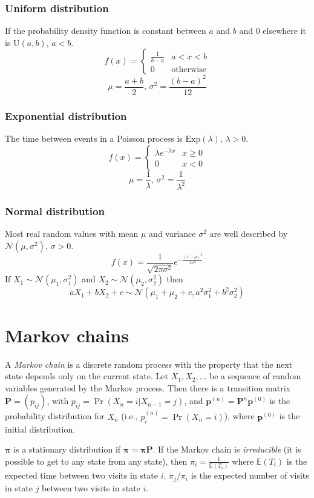 \subsubsection{Uniform distribution}
If the probability density function is constant between $a$ and $b$ and 0 elsewhere it is $\textrm{U}(a,b),\,a<b$.
\[f(x) = \left\{
\begin{array}{cl}
\frac{1}{b-a} & a<x<b\\
0 & \textrm{otherwise}
\end{array}\right.\]
\[\mu=\frac{a+b}{2},\,\sigma^2=\frac{(b-a)^2}{12}\]

\subsubsection{Exponential distribution}
The time between events in a Poisson process is $\textrm{Exp}(\lambda),\,\lambda>0$.
\[f(x) = \left\{
\begin{array}{cl}
\lambda e^{-\lambda x} & x\geq0\\
0 & x<0
\end{array}\right.\]
\[\mu=\frac{1}{\lambda},\,\sigma^2=\frac{1}{\lambda^2}\]

\subsubsection{Normal distribution}
Most real random values with mean $\mu$ and variance $\sigma^2$ are well described by $\mathcal{N}(\mu,\sigma^2),\,\sigma>0$.
\[ f(x) = \frac{1}{\sqrt{2\pi\sigma^2}}e^{-\frac{(x-\mu)^2}{2\sigma^2}} \]
If $X_1 \sim \mathcal{N}(\mu_1,\sigma_1^2)$ and $X_2 \sim \mathcal{N}(\mu_2,\sigma_2^2)$ then
\[ aX_1 + bX_2 + c \sim \mathcal{N}(\mu_1+\mu_2+c,a^2\sigma_1^2+b^2\sigma_2^2) \]

\section{Markov chains}
A \emph{Markov chain} is a discrete random process with the property that the next state depends only on the current state.
Let $X_1,X_2,\ldots$ be a sequence of random variables generated by the Markov process.
Then there is a transition matrix $\mathbf{P} = (p_{ij})$, with $p_{ij} = \Pr(X_n = i | X_{n-1} = j)$,
and $\mathbf{p}^{(n)} = \mathbf P^n \mathbf p^{(0)}$ is the probability distribution for $X_n$ (i.e., $p^{(n)}_i = \Pr(X_n = i)$),
where $\mathbf{p}^{(0)}$ is the initial distribution.

$\mathbf{\pi}$ is a stationary distribution if $\mathbf{\pi} = \mathbf{\pi P}$.
If the Markov chain is \emph{irreducible} (it is possible to get to any state from any state),
then $\pi_i = \frac{1}{\mathbb{E}(T_i)}$ where $\mathbb{E}(T_i)$  is the expected time between two visits in state $i$.
$\pi_j/\pi_i$ is the expected number of visits in state $j$ between two visits in state $i$.

